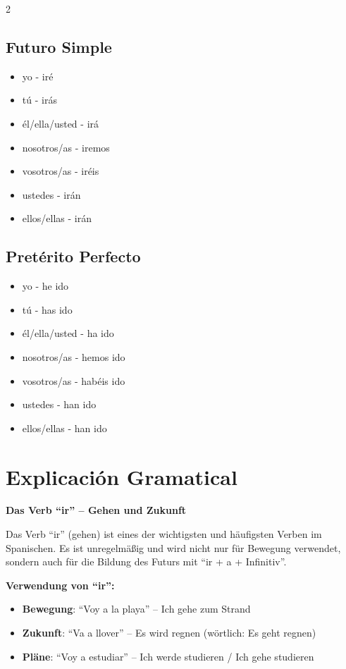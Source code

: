 \documentclass[12pt,a4paper]{article}
\begin{document}
\begin{multicols}{2}
\subsection*{Futuro Simple}
\begin{itemize}[leftmargin=*]
    \item yo - iré
    \item tú - irás
    \item él/ella/usted - irá
    \item nosotros/as - iremos
    \item vosotros/as - iréis
    \item ustedes - irán
    \item ellos/ellas - irán
\end{itemize}

\subsection*{Pretérito Perfecto}
\begin{itemize}[leftmargin=*]
    \item yo - he ido
    \item tú - has ido
    \item él/ella/usted - ha ido
    \item nosotros/as - hemos ido
    \item vosotros/as - habéis ido
    \item ustedes - han ido
    \item ellos/ellas - han ido
\end{itemize}

\end{multicols}

\newpage

\section*{Explicación Gramatical}

\textbf{Das Verb \enquote{ir} -- Gehen und Zukunft}

Das Verb \enquote{ir} (gehen) ist eines der wichtigsten und häufigsten Verben im Spanischen. Es ist unregelmäßig und wird nicht nur für Bewegung verwendet, sondern auch für die Bildung des Futurs mit \enquote{ir + a + Infinitiv}.

\textbf{Verwendung von \enquote{ir}:}
\begin{itemize}[leftmargin=*]
    \item \textbf{Bewegung}: \enquote{Voy a la playa} -- Ich gehe zum Strand
    \item \textbf{Zukunft}: \enquote{Va a llover} -- Es wird regnen (wörtlich: Es geht regnen)
    \item \textbf{Pläne}: \enquote{Voy a estudiar} -- Ich werde studieren / Ich gehe studieren
\end{itemize}
\end{document}
